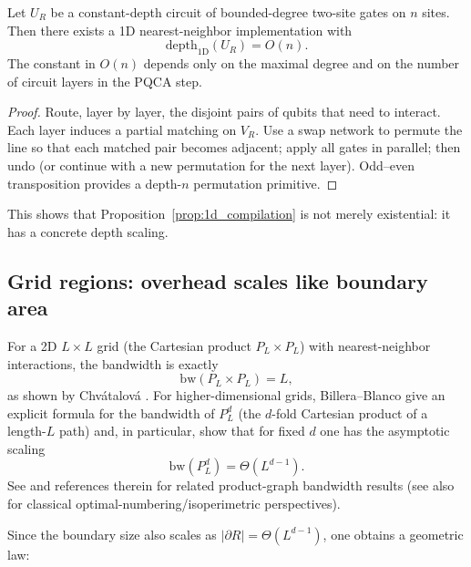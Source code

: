 \begin{proposition}
\label{prop:swap_upper_bound}
Let $U_R$ be a constant-depth circuit of bounded-degree two-site gates on $n$ sites.
Then there exists a 1D nearest-neighbor implementation with
\begin{equation}
\mathrm{depth}_{\mathrm{1D}}(U_R) = O(n).
\end{equation}
The constant in $O(n)$ depends only on the maximal degree and on the number of circuit layers in the PQCA step.
\end{proposition}

\begin{proof}
Route, layer by layer, the disjoint pairs of qubits that need to interact.
Each layer induces a partial matching on $V_R$.
Use a swap network to permute the line so that each matched pair becomes adjacent; apply all gates in parallel; then undo (or continue with a new permutation for the next layer).
Odd--even transposition provides a depth-$n$ permutation primitive.
\end{proof}

This shows that Proposition~\ref{prop:1d_compilation} is not merely existential: it has a concrete depth scaling.

\subsection{Grid regions: overhead scales like boundary area}
For a 2D $L\times L$ grid (the Cartesian product $P_L\times P_L$) with nearest-neighbor interactions, the bandwidth is exactly
\begin{equation}
\mathrm{bw}(P_L\times P_L)=L,
\end{equation}
as shown by Chv{\'a}talov{\'a} \cite{Chvatalova1975}.
For higher-dimensional grids, Billera--Blanco give an explicit formula for the bandwidth of $P_L^d$ (the $d$-fold Cartesian product of a length-$L$ path) and, in particular, show that for fixed $d$ one has the asymptotic scaling
\begin{equation}
\mathrm{bw}(P_L^d)=\Theta(L^{d-1}).
\end{equation}
See \cite{BilleraBlanco2013} and references therein for related product-graph bandwidth results (see also \cite{Harper1966} for classical optimal-numbering/isoperimetric perspectives).

Since the boundary size also scales as $|\partial R|=\Theta(L^{d-1})$, one obtains a geometric law:

